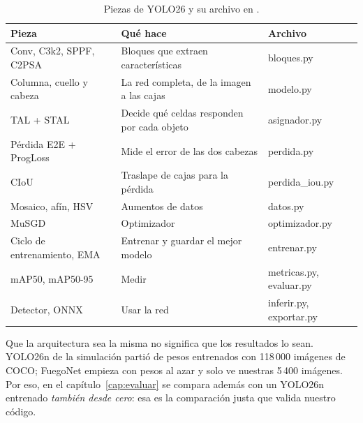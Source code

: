\begin{table}[H]
\centering\small
\caption{Piezas de YOLO26 y su archivo en .}
\label{tab:plan}
\begin{tabularx}{\textwidth}{>{\raggedright}p{4.2cm}X>{\ttfamily}p{2.6cm}}
\toprule
\textbf{Pieza} & \textbf{Qué hace} & \textrm{\textbf{Archivo}}\\
\midrule
Conv, C3k2, SPPF, C2PSA & Bloques que extraen características & bloques.py\\
Columna, cuello y cabeza & La red completa, de la imagen a las cajas & modelo.py\\
TAL + STAL & Decide qué celdas responden por cada objeto & asignador.py\\
Pérdida E2E + ProgLoss & Mide el error de las dos cabezas & perdida.py\\
CIoU & Traslape de cajas para la pérdida & perdida\_iou.py\\
Mosaico, afín, HSV & Aumentos de datos & datos.py\\
MuSGD & Optimizador & optimizador.py\\
Ciclo de entrenamiento, EMA & Entrenar y guardar el mejor modelo & entrenar.py\\
mAP50, mAP50-95 & Medir & metricas.py, evaluar.py\\
Detector, ONNX & Usar la red & inferir.py, exportar.py\\
\bottomrule
\end{tabularx}
\end{table}

\begin{recuerda}
Que la arquitectura sea la misma no significa que los resultados lo sean. YOLO26n
de la simulación partió de pesos entrenados con 118\,000 imágenes de COCO;
FuegoNet empieza con pesos al azar y solo ve nuestras 5\,400 imágenes. Por eso,
en el capítulo~\ref{cap:evaluar} se compara además con un YOLO26n entrenado
\emph{también desde cero}: esa es la comparación justa que valida nuestro código.
\end{recuerda}
